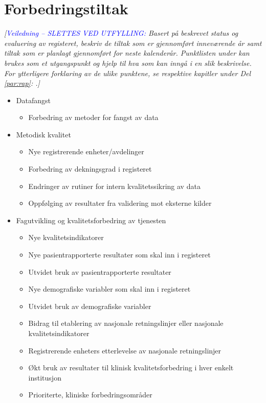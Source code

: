 \documentclass[norsk, a4paper, twocolumn]{report}
\newcommand{\newtext}[1]{\cbstart\textcolor{blue}{#1\cbend}}
\newcommand{\guide}[1] {
	\textit{[\textcolor{guidegray}{\newtext{Veiledning -- SLETTES VED UTFYLLING:} #1}]}
	}
\begin{document}
\chapter{Forbedringstiltak}
\guide{Basert på beskrevet status og evaluering av registeret, beskriv de
tiltak som er gjennomført inneværende år samt tiltak som er planlagt gjennomført  for neste kalenderår.
Punktlisten under kan brukes som et utgangspunkt og hjelp til hva som kan
inngå i en slik beskrivelse. For ytterligere forklaring av de ulike punktene,
se respektive kapitler under Del \ref{par:rap}: \nameref{par:rap}.}

\begin{itemize}
  \item Datafangst
    \begin{itemize}
      \item Forbedring av metoder for fangst av data
    \end{itemize}
  \item Metodisk kvalitet
    \begin{itemize}
      \item Nye registrerende enheter/avdelinger
      \item Forbedring av dekningsgrad i registeret
      \item Endringer av rutiner for intern kvalitetssikring av data
      \item Oppfølging av resultater fra validering mot eksterne kilder
    \end{itemize}
  \item Fagutvikling og kvalitetsforbedring av tjenesten
    \begin{itemize}
      \item Nye kvalitetsindikatorer
      \item Nye pasientrapporterte resultater som skal inn i registeret
      \item Utvidet bruk av pasientrapporterte resultater
      \item Nye demografiske variabler som skal inn i registeret
      \item Utvidet bruk av demografiske variabler
      \item Bidrag til etablering av nasjonale retningslinjer eller 
        nasjonale kvalitetsindikatorer
      \item Registrerende enheters etterlevelse av nasjonale retningslinjer
      \item Økt bruk av resultater til klinisk kvalitetsforbedring i hver
        enkelt institusjon
      \item Prioriterte, kliniske forbedringsområder

\end{itemize}
\end{itemize}
\end{document}
